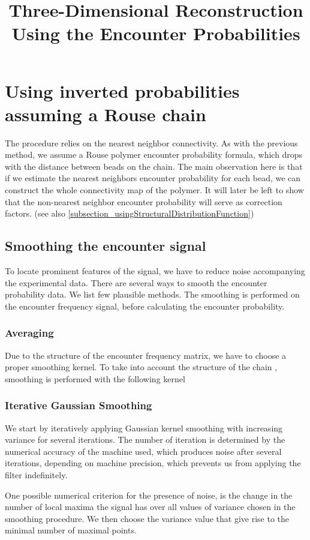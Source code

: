 \documentclass[12pt]{article}
\title{Three-Dimensional Reconstruction Using the Encounter Probabilities}
\begin{document}
\maketitle

\section{Using inverted probabilities assuming a Rouse chain}
The procedure relies on the nearest neighbor connectivity. As with the previous method, we assume a Rouse polymer encounter probability formula, which drops with the distance between beads on the chain. The main observation here is that if we estimate the nearest neighbors encounter probability for each bead, we can construct the whole connectivity map of the polymer. It will later be left to show that the non-nearest neighbor encounter probability will serve as correction factors. (see also \ref{subsection_usingStructuralDistributionFunction})

\subsection{Smoothing the encounter signal}
To locate prominent features of the signal, we have to reduce noise accompanying the experimental data. There are several ways to smooth the encounter probability data. We list few plausible methods.
The smoothing is performed on the encounter frequency signal, before calculating the encounter probability. 

\subsubsection{Averaging}
Due to the structure of the encounter frequency matrix, we have to choose a proper smoothing kernel. To take into account the structure of the chain , smoothing is performed with the following kernel 


\subsubsection{Iterative Gaussian Smoothing}
We start by iteratively applying Gaussian kernel smoothing with increasing variance for several iterations. The number of iteration is determined by the numerical accuracy of the machine used, which produces noise after several iterations, depending on machine precision, which prevents us from applying the filter indefinitely. 

One possible numerical criterion for the presence of noise, is the change in the number of local maxima the signal has over all values of variance chosen in the smoothing procedure. We then choose the variance value that give rise to the minimal number of maximal points. 
\end{document}
